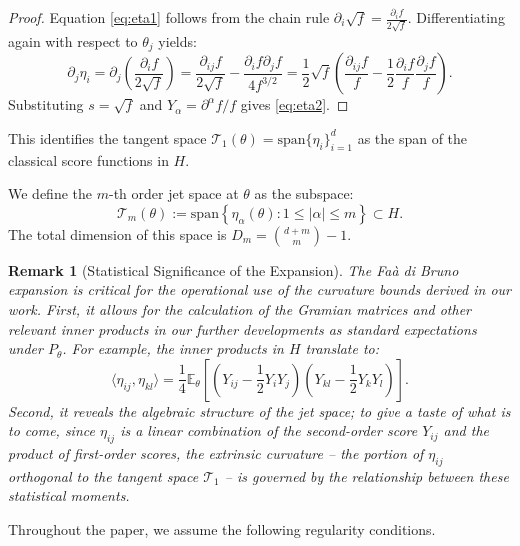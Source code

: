 \documentclass[pdflatex,sn-mathphys-num]{sn-jnl}%
\newcommand{\ip}[2]{\langle #1,#2\rangle}
\theoremstyle{thmstyleone}%
\theoremstyle{thmstyletwo}%
\newtheorem{remark}{Remark}%
\theoremstyle{thmstylethree}%
\begin{document}
\begin{proof}
Equation \eqref{eq:eta1} follows from the chain rule $\partial_i \sqrt{f} = \frac{\partial_i f}{2\sqrt{f}}$. Differentiating again with respect to $\theta_j$ yields:
\[
\partial_j \eta_i = \partial_j \left( \frac{\partial_i f}{2\sqrt{f}} \right) = \frac{\partial_{ij} f}{2\sqrt{f}} - \frac{\partial_i f \partial_j f}{4 f^{3/2}} = \frac{1}{2} \sqrt{f} \left( \frac{\partial_{ij} f}{f} - \frac{1}{2} \frac{\partial_i f}{f} \frac{\partial_j f}{f} \right).
\]
Substituting $s = \sqrt{f}$ and $Y_\alpha = \partial^\alpha f / f$ gives \eqref{eq:eta2}.
\end{proof}

This identifies the tangent space $\mathcal{T}_1(\theta) = \mathrm{span}\{\eta_i\}_{i=1}^d$ as the span of the classical score functions in $H$. 

We define the $m$-th order jet space at $\theta$ as the subspace:
\[
\mathcal{T}_m(\theta) := \mathrm{span} \left\{ \eta_\alpha(\theta) : 1 \le |\alpha| \le m \right\} \subset H.
\]
The total dimension of this space is $D_m = \binom{d+m}{m}-1$.

\begin{remark}[Statistical Significance of the Expansion]
The Fa\`a di Bruno expansion is critical for the operational use of the curvature bounds derived in our work. First, it allows for the calculation of the Gramian matrices and other relevant inner products in our further developments as standard expectations under $P_\theta$. For example, the inner products in $H$ translate to:
\[
\ip{\eta_{ij}}{\eta_{kl}} = \frac{1}{4} \mathbb{E}_\theta \left[ \left( Y_{ij} - \frac{1}{2} Y_i Y_j \right) \left( Y_{kl} - \frac{1}{2} Y_k Y_l \right) \right].
\]
Second, it reveals the algebraic structure of the jet space; to give a taste of what is to come, since $\eta_{ij}$ is a linear combination of the second-order score $Y_{ij}$ and the product of first-order scores, the extrinsic curvature -- the portion of $\eta_{ij}$ orthogonal to the tangent space $\mathcal{T}_1$ -- is governed by the relationship between these statistical moments. 
\end{remark}

Throughout the paper, we assume the following regularity conditions.
\end{document}
